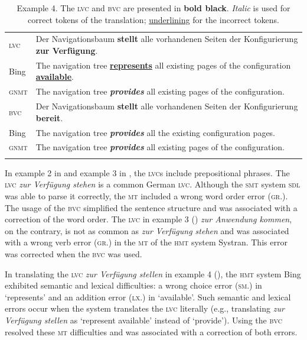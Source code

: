 \documentclass[output=paper]{langsci/langscibook}
\begin{document}
\begin{table}[p]
\caption{Example 4. The \textsc{lvc} and \textsc{bvc} are presented in \textbf{bold black}. \textit{Italic} is used for correct tokens of the translation; \uline{underlining} for the incorrect tokens.\label{marzouk:table5}}
\begin{tabularx}{\textwidth}{lQ}
\lsptoprule
\textsc{lvc}&Der Navigationsbaum \textbf{stellt} alle vorhandenen Seiten der Konfigurierung \textbf{zur Verfügung}.\\
Bing &The navigation tree \uline{\textbf{represents}} all existing pages of the configuration \uline{\textbf{available}}.\\
\textsc{gnmt}&The navigation tree \textit{\textbf{provides}} all existing pages of the configuration.\\
\midrule
\textsc{bvc}&Der Navigationsbaum \textbf{stellt	} alle vorhandenen Seiten der Konfigurierung \textbf{bereit}.\\
Bing&The navigation tree \textbf{\textit{provides}} all the existing configuration pages.\\
\textsc{gnmt}&The navigation tree \textit{\textbf{provides}} all existing pages of the configuration.\\
\lspbottomrule
\end{tabularx}
\end{table}


In example 2 in  and example 3 in , the \textsc{lvc}s include prepositional phrases. The \textsc{lvc} \textit{zur Verfügung stehen} is a common German \textsc{lvc}. Although the \textsc{smt} system \textsc{sdl} was able to parse it correctly, the \textsc{mt} included a wrong word order error (\textsc{gr}.). The usage of the \textsc{bvc} simplified the sentence structure and was associated with a correction of the word order. The \textsc{lvc} in example 3 () \textit{zur Anwendung kommen}, on the contrary, is not as common as \textit{zur Verfügung stehen} and was associated with a wrong verb error (\textsc{gr}.) in the \textsc{mt} of the \textsc{hmt} system Systran. This error was corrected when the \textsc{bvc} was used.


In translating the \textsc{lvc} \textit{zur Verfügung stellen} in example 4 (), the \textsc{hmt} system Bing exhibited semantic and lexical difficulties: a wrong choice error (\textsc{sm}.) in ‘represents’ and an addition error (\textsc{lx}.) in ‘available’. Such semantic and lexical errors occur when the system translates the \textsc{lvc} literally (e.g., translating \textit{zur Verfügung stellen} as ‘represent available’ instead of ‘provide’). Using the \textsc{bvc} resolved these \textsc{mt} difficulties and was associated with a correction of both errors.
\end{document}
